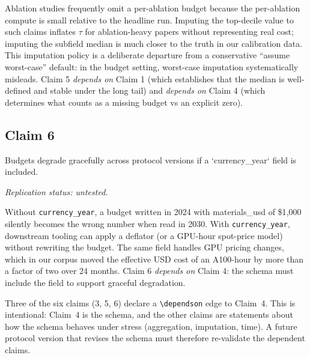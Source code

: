 \documentclass{rrxiv}
\begin{document}
Ablation studies frequently omit a per-ablation budget because the per-ablation compute is small relative to the headline run. Imputing the top-decile value to such claims inflates $\tau$ for ablation-heavy papers without representing real cost; imputing the subfield median is much closer to the truth in our calibration data. This imputation policy is a deliberate departure from a conservative ``assume worst-case'' default: in the budget setting, worst-case imputation systematically misleads. Claim 5 \emph{depends on} Claim 1 (which establishes that the median is well-defined and stable under the long tail) and \emph{depends on} Claim 4 (which determines what counts as a missing budget vs an explicit zero).


\subsection*{Claim 6}
\begin{claim}[title=Claim 6, type=methodological, evidence=argument,
              confidence=0.7,
              rationale={design argument; the factor-of-two movement in
                A100 spot pricing over 24 months is observed in the
                corpus, but graceful degradation has not yet been
                exercised across a real protocol-version boundary},
              labels={reproducibility, methodology, forward-compatibility}]
\label{claim:c6}
Budgets degrade gracefully across protocol versions if a `currency\_year` field is included.

\emph{Replication status: untested.}
\end{claim}

Without \texttt{currency\_year}, a budget written in 2024 with materials\_usd of \$1{,}000 silently becomes the wrong number when read in 2030. With \texttt{currency\_year}, downstream tooling can apply a deflator (or a GPU-hour spot-price model) without rewriting the budget. The same field handles GPU pricing changes, which in our corpus moved the effective USD cost of an A100-hour by more than a factor of two over 24 months. Claim 6 \emph{depends on} Claim 4: the schema must include the field to support graceful degradation.


\begin{rrxivremark}
Three of the six claims (3, 5, 6) declare a \texttt{\textbackslash dependson} edge to Claim~4. This is intentional: Claim~4 is the schema, and the other claims are statements about how the schema behaves under stress (aggregation, imputation, time). A future protocol version that revises the schema must therefore re-validate the dependent claims.
\end{rrxivremark}
\end{document}
